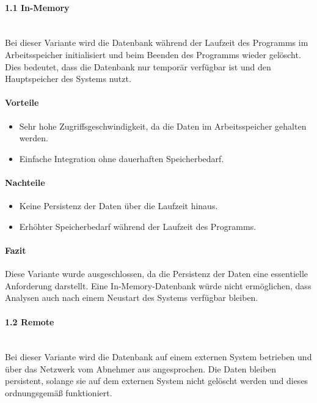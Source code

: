 \documentclass[a4paper,12pt]{report}
\begin{document}
    \paragraph*{1.1 In-Memory}\mbox{}\\
    Bei dieser Variante wird die Datenbank während der Laufzeit des Programms im Arbeitsspeicher initialisiert und beim Beenden des Programms wieder gelöscht.
    Dies bedeutet, dass die Datenbank nur temporär verfügbar ist und den Hauptspeicher des Systems nutzt.

    \paragraph*{Vorteile}
    \begin{itemize}
        \item Sehr hohe Zugriffsgeschwindigkeit, da die Daten im Arbeitsspeicher gehalten werden.
        \item Einfache Integration ohne dauerhaften Speicherbedarf.
    \end{itemize}

    \paragraph*{Nachteile}
    \begin{itemize}
        \item Keine Persistenz der Daten über die Laufzeit hinaus.
        \item Erhöhter Speicherbedarf während der Laufzeit des Programms.
    \end{itemize}

    \paragraph*{Fazit}
    Diese Variante wurde ausgeschlossen, da die Persistenz der Daten eine essentielle Anforderung darstellt.
    Eine In-Memory-Datenbank würde nicht ermöglichen, dass Analysen auch nach einem Neustart des Systems verfügbar bleiben.

    \paragraph*{1.2 Remote}\mbox{}\\
    Bei dieser Variante wird die Datenbank auf einem externen System betrieben und über das Netzwerk vom Abnehmer aus angesprochen.
    Die Daten bleiben persistent, solange sie auf dem externen System nicht gelöscht werden und dieses ordnungsgemäß funktioniert.
\end{document}
